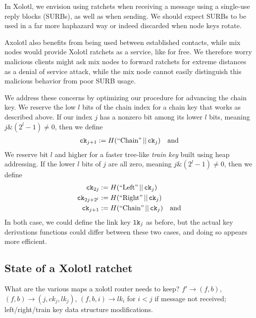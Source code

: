 \documentclass[twoside,letterpaper]{llncs}
\def\mathcomma{}
\begin{document}
In Xolotl, we envision using ratchets when receiving a message 
using a single-use reply blocks (SURBs), as well as when sending.
We should expect SURBs to be used in a far more haphazard way or
indeed discarded when node keys rotate.  

Axolotl also benefits from being used between established contacts,
while mix nodes would provide Xolotl ratchets as a service, like
for free.  We therefore worry malicious clients might ask mix nodes
to forward ratchets for extreme distances as a denial of service
attack, while the mix node cannot easily distinguish this malicious
behavior from poor SURB usage.

We address these concerns by optimizing our procedure for advancing
the chain key.  We reserve the low $l$ bits of the chain index
for a chain key that works as described above.  
If our index $j$ has a nonzero bit among its lower $l$ bits,
meaning $j \& (2^l-1) \neq 0$, then
we define
\[ \begin{aligned}
 \ck_{j+1} &:= H(\textrm{``Chain''} \,||\, \ck_j) \quad\textrm{and} \\ %
\end{aligned} \]
We reserve bit $l$ and higher for a faster tree-like {\it train key}
built using heap addressing.  If the lower $l$ bits of $j$ are
all zero, meaning $j \& (2^l-1) \neq 0$, then we define 
\[ \begin{aligned}
 \ck_{2j} &:= H(\textrm{``Left''} \,||\, \ck_j) \mathcomma \\
 \ck_{2j+2^l} &:= H(\textrm{``Right''} \,||\, \ck_j) \mathcomma \\
 \ck_{j+1} &:= H(\textrm{``Chain''} \,||\, \ck_j) \quad\textrm{and} \\
\end{aligned} \]
In both case, we could define the link key $\texttt{lk}_j$ as before, but
the actual key derivations functions could differ between these two
cases, and doing so appears more efficient.


\subsection{State of a Xolotl ratchet}

What are the various maps a xolotl router needs to keep?
$f' \to (f,b)$, $(f,b) \to (j,ck_j,lk_j)$,
$(f,b,i) \to lk_i$ for $i < j$ if message not received;
left/right/train key data structure modifications.
\end{document}
